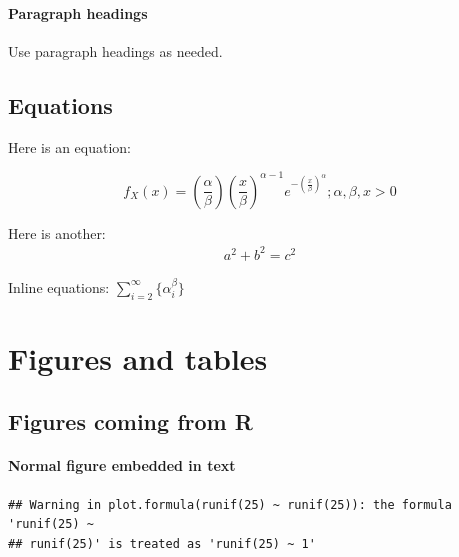 \documentclass[useAMS,usenatbib,referee]{biom}
\begin{document}
\hypertarget{paragraph-headings}{%
\paragraph{Paragraph headings}\label{paragraph-headings}}

Use paragraph headings as needed.

\hypertarget{equations}{%
\subsection{Equations}\label{equations}}

Here is an equation:

\[ f_{X}(x) = \left(\frac{\alpha}{\beta}\right)\left(\frac{x}{\beta}\right)^{\alpha-1}e^{-\left(\frac{x}{\beta}\right)^{\alpha}}; \alpha,\beta,x > 0 \]

Here is another: \begin{align}
a^2+b^2=c^2
\end{align}

Inline equations: \(\sum_{i = 2}^\infty\{\alpha_i^\beta\}\)

\hypertarget{figures-and-tables}{%
\section{Figures and tables}\label{figures-and-tables}}

\hypertarget{figures-coming-from-r}{%
\subsection{Figures coming from R}\label{figures-coming-from-r}}

\hypertarget{normal-figure-embedded-in-text}{%
\paragraph{Normal figure embedded in
text}\label{normal-figure-embedded-in-text}}

\begin{verbatim}
## Warning in plot.formula(runif(25) ~ runif(25)): the formula 'runif(25) ~
## runif(25)' is treated as 'runif(25) ~ 1'
\end{verbatim}
\end{document}
